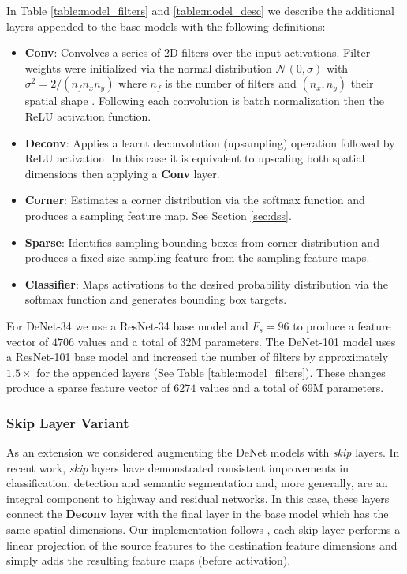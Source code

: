 \documentclass[10pt,twocolumn]{article}
\begin{document}
In Table \ref{table:model_filters} and \ref{table:model_desc} we describe the additional layers appended to the base models with the following definitions:
\begin{itemize}
\item \textbf{Conv}: Convolves a series of 2D filters over the input activations. Filter weights were initialized via the normal distribution $\mathcal{N}(0,\sigma)$ with $\sigma^2 = 2 / (n_f n_x n_y)$ where $n_f$ is the number of filters and $(n_x, n_y)$ their spatial shape \cite{init}. Following each convolution is batch normalization \cite{batchnorm} then the ReLU activation function.
\item \textbf{Deconv}: Applies a learnt deconvolution\cite{deconv} (upsampling) operation followed by ReLU activation. In this case it is equivalent to upscaling both spatial dimensions then applying a \textbf{Conv} layer. 
\item \textbf{Corner}: Estimates a corner distribution via the softmax function and produces a sampling feature map. See Section \ref{sec:dss}.
\item \textbf{Sparse}: Identifies sampling bounding boxes from corner distribution and produces a fixed size sampling feature from the sampling feature maps. \item \textbf{Classifier}: Maps activations to the desired probability distribution via the softmax function and generates bounding box targets.
\end{itemize}

For DeNet-34 we use a ResNet-34 base model and $F_s=96$ to produce a feature vector of $4706$ values and a total of 32M parameters. The DeNet-101 model uses a ResNet-101 base model and increased the number of filters by approximately $1.5\times$ for the appended layers (See Table \ref{table:model_filters}). These changes produce a sparse feature vector of $6274$ values and a total of 69M parameters.

\subsubsection{Skip Layer Variant}

As an extension we considered augmenting the DeNet models with \textit{skip} layers. In recent work, \textit{skip} layers have demonstrated consistent improvements in classification\cite{resnet}, detection\cite{fpn} and semantic segmentation\cite{semanticskip} and, more generally, are an integral component to highway \cite{highway} and residual networks\cite{resnet}. In this case, these layers connect the \textbf{Deconv} layer with the final layer in the base model which has the same spatial dimensions. Our implementation follows \cite{fpn}, each skip layer performs a linear projection of the source features to the destination feature dimensions and simply adds the resulting feature maps (before activation). 
 
\end{document}
